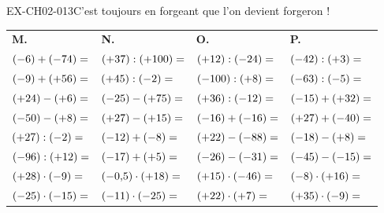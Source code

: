 \begin{exercice}{EX-CH02-013}{C'est toujours en forgeant que l'on devient forgeron !}
{\bigskip
\begin{tabularx}{\linewidth}{*{4}{X}}
\textbf{M.} & \textbf{N.} & \textbf{O.} & \textbf{P.} \\
$(-6)+(-74)= \dotfill$      & $(+37):(+100)= \dotfill$  & $(+12):(-24)= \dotfill$     & $(-42):(+3)= \dotfill$       \\
$(-9)+(+56)= \dotfill$      & $(+45):(-2)= \dotfill$    & $(-100):(+8)= \dotfill$     & $(-63):(-5)= \dotfill$       \\
$(+24)-(+6)= \dotfill$      & $(-25)-(+75)= \dotfill$   & $(+36):(-12)= \dotfill$     & $(-15)+(+32)= \dotfill$      \\
$(-50)-(+8)= \dotfill$      & $(+27)-(+15)= \dotfill$   & $(-16)+(-16)= \dotfill$     & $(+27)+(-40)= \dotfill$      \\
$(+27):(-2)= \dotfill$      & $(-12)+(-8)= \dotfill$    & $(+22)-(-88)= \dotfill$     & $(-18)-(+8)= \dotfill$       \\
$(-96):(+12)= \dotfill$     & $(-17)+(+5)= \dotfill$    & $(-26)-(-31)= \dotfill$     & $(-45)-(-15)= \dotfill$      \\
$(+28)\cdot(-9)= \dotfill$  & $(-0{,}5)\cdot(+18)= \dotfill$ & $(+15)\cdot(-46)= \dotfill$ & $(-8)\cdot(+16)= \dotfill$ \\
$(-25)\cdot(-15)= \dotfill$ & $(-11)\cdot(-25)= \dotfill$ & $(+22)\cdot(+7)= \dotfill$ & $(+35)\cdot(-9)= \dotfill$   \\
\end{tabularx}
}
\end{exercice}

